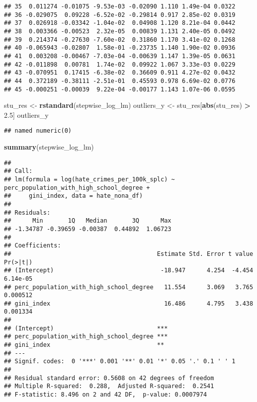 \documentclass[
]{article}
\newenvironment{Shaded}{\begin{snugshade}}{\end{snugshade}}
\newcommand{\FloatTok}[1]{\textcolor[rgb]{0.00,0.00,0.81}{#1}}
\newcommand{\KeywordTok}[1]{\textcolor[rgb]{0.13,0.29,0.53}{\textbf{#1}}}
\newcommand{\NormalTok}[1]{#1}
\newcommand{\OperatorTok}[1]{\textcolor[rgb]{0.81,0.36,0.00}{\textbf{#1}}}
\newcommand{\StringTok}[1]{\textcolor[rgb]{0.31,0.60,0.02}{#1}}
\begin{document}
\begin{verbatim}
## 35  0.011274 -0.01075 -9.53e-03 -0.02090 1.110 1.49e-04 0.0322    
## 36 -0.029075  0.09228 -6.52e-02 -0.29814 0.917 2.85e-02 0.0319    
## 37  0.026918 -0.03342 -1.04e-02  0.04908 1.120 8.21e-04 0.0442    
## 38  0.003366 -0.00523  2.32e-05  0.00839 1.131 2.40e-05 0.0492    
## 39  0.214374 -0.27630 -7.60e-02  0.31860 1.170 3.41e-02 0.1268    
## 40 -0.065943 -0.02807  1.58e-01 -0.23735 1.140 1.90e-02 0.0936    
## 41  0.003208 -0.00467 -7.03e-04 -0.00639 1.147 1.39e-05 0.0631    
## 42 -0.011898  0.00781  1.74e-02  0.09922 1.067 3.33e-03 0.0229    
## 43 -0.070951  0.17415 -6.38e-02  0.36609 0.911 4.27e-02 0.0432    
## 44  0.372189 -0.38111 -2.51e-01  0.45593 0.978 6.69e-02 0.0776    
## 45 -0.000251 -0.00039  9.22e-04 -0.00177 1.143 1.07e-06 0.0595
\end{verbatim}

\begin{Shaded}
\begin{Highlighting}[]
\NormalTok{stu_res <-}\StringTok{ }\KeywordTok{rstandard}\NormalTok{(stepwise_log_lm)}
\NormalTok{outliers_y <-}\StringTok{ }\NormalTok{stu_res[}\KeywordTok{abs}\NormalTok{(stu_res) }\OperatorTok{>}\StringTok{ }\FloatTok{2.5}\NormalTok{]}
\NormalTok{outliers_y}
\end{Highlighting}
\end{Shaded}

\begin{verbatim}
## named numeric(0)
\end{verbatim}

\begin{Shaded}
\begin{Highlighting}[]
\KeywordTok{summary}\NormalTok{(stepwise_log_lm)}
\end{Highlighting}
\end{Shaded}

\begin{verbatim}
## 
## Call:
## lm(formula = log(hate_crimes_per_100k_splc) ~ perc_population_with_high_school_degree + 
##     gini_index, data = hate_nona_df)
## 
## Residuals:
##      Min       1Q   Median       3Q      Max 
## -1.34787 -0.39659 -0.00387  0.44892  1.06723 
## 
## Coefficients:
##                                         Estimate Std. Error t value Pr(>|t|)
## (Intercept)                              -18.947      4.254  -4.454 6.14e-05
## perc_population_with_high_school_degree   11.554      3.069   3.765 0.000512
## gini_index                                16.486      4.795   3.438 0.001334
##                                            
## (Intercept)                             ***
## perc_population_with_high_school_degree ***
## gini_index                              ** 
## ---
## Signif. codes:  0 '***' 0.001 '**' 0.01 '*' 0.05 '.' 0.1 ' ' 1
## 
## Residual standard error: 0.5608 on 42 degrees of freedom
## Multiple R-squared:  0.288,  Adjusted R-squared:  0.2541 
## F-statistic: 8.496 on 2 and 42 DF,  p-value: 0.0007974
\end{verbatim}
\end{document}
